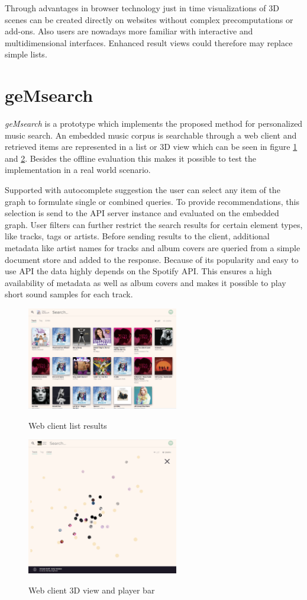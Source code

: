 \documentclass[sigconf]{acmart}
\begin{document}
Through advantages in browser technology just in time visualizations of 3D scenes can be created directly on websites without complex precomputations or add-ons. Also users are nowadays more familiar with interactive and multidimensional interfaces. Enhanced result views could therefore may replace simple lists.

\section{geMsearch}
\emph{geMsearch} is a prototype which implements the proposed method for personalized music search. An embedded music corpus is searchable through a web client and retrieved items are represented in a list or 3D view which can be seen in figure \ref{fig:web_client} and \ref{fig:web_client_3d}. Besides the offline evaluation this makes it possible to test the implementation in a real world scenario. 

Supported with autocomplete suggestion the user can select any item of the graph to formulate single or combined queries. To provide recommendations, this selection is send to the API server instance and evaluated on the embedded graph. User filters can further restrict the search results for certain element types, like tracks, tags or artists. Before sending results to the client, additional metadata like artist names for tracks and album covers are queried from a simple document store and added to the response. Because of its popularity and easy to use API the data highly depends on the Spotify API. This ensures a high availability of metadata as well as album covers and makes it possible to play short sound samples for each track.\\

\begin{figure}[ht]
	{\includegraphics[width=250px]{web_client.png}}	
	\caption{Web client list results}
	\label{fig:web_client}
\end{figure}

\begin{figure}[ht]
	{\includegraphics[width=250px]{web_client_3d.png}}	
	\caption{Web client 3D view and player bar}
	\label{fig:web_client_3d}
\end{figure}
\end{document}
